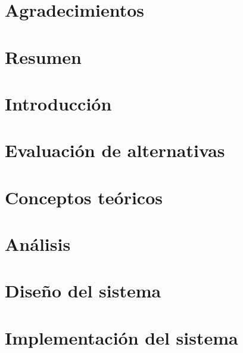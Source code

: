 \documentclass{report}
\begin{document}




\chapter*{Agradecimientos}
\label{agradecimientos}


\chapter*{Resumen}
\label{resumen}


\tableofcontents
{}

\listoffigures

\listoftables

\chapter{Introducción}
\label{chapter01}


\chapter{Evaluación de alternativas}
\label{chapter02}


\chapter{Conceptos teóricos}
\label{chapter03}


\chapter{Análisis}
\label{chapter04}


\chapter{Diseño del sistema}
\label{chapter05}


\chapter{Implementación del sistema}
\label{chapter:implementacion}

\end{document}
